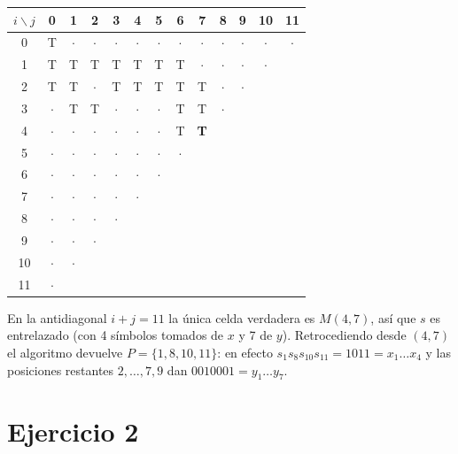 \begin{center}
\small
\setlength{\tabcolsep}{4pt}
\begin{tabular}{c|cccccccccccc}
$i\backslash j$ & 0 & 1 & 2 & 3 & 4 & 5 & 6 & 7 & 8 & 9 & 10 & 11\\ \hline
0  & T & $\cdot$ & $\cdot$ & $\cdot$ & $\cdot$ & $\cdot$ & $\cdot$ & $\cdot$ & $\cdot$ & $\cdot$ & $\cdot$ & $\cdot$\\
1  & T & T & T & T & T & T & T & $\cdot$ & $\cdot$ & $\cdot$ & $\cdot$ & \\
2  & T & T & $\cdot$ & T & T & T & T & T & $\cdot$ & $\cdot$ & & \\
3  & $\cdot$ & T & T & $\cdot$ & $\cdot$ & $\cdot$ & T & T & $\cdot$ & & & \\
4  & $\cdot$ & $\cdot$ & $\cdot$ & $\cdot$ & $\cdot$ & $\cdot$ & T & \textbf{T} & & & & \\
5  & $\cdot$ & $\cdot$ & $\cdot$ & $\cdot$ & $\cdot$ & $\cdot$ & $\cdot$ & & & & & \\
6  & $\cdot$ & $\cdot$ & $\cdot$ & $\cdot$ & $\cdot$ & $\cdot$ & & & & & & \\
7  & $\cdot$ & $\cdot$ & $\cdot$ & $\cdot$ & $\cdot$ & & & & & & & \\
8  & $\cdot$ & $\cdot$ & $\cdot$ & $\cdot$ & & & & & & & & \\
9  & $\cdot$ & $\cdot$ & $\cdot$ & & & & & & & & & \\
10 & $\cdot$ & $\cdot$ & & & & & & & & & & \\
11 & $\cdot$ & & & & & & & & & & & \\
\end{tabular}
\end{center}

En la antidiagonal $i+j=11$ la única celda verdadera es $M(4,7)$, así que $s$ es entrelazado (con 4
símbolos tomados de $x$ y 7 de $y$). Retrocediendo desde $(4,7)$ el algoritmo devuelve
$P=\{1,8,10,11\}$: en efecto $s_1s_8s_{10}s_{11} = 1011 = x_1\dots x_4$ y las posiciones restantes
$2,\dots,7,9$ dan $0010001 = y_1\dots y_7$.

\section{Ejercicio 2}

